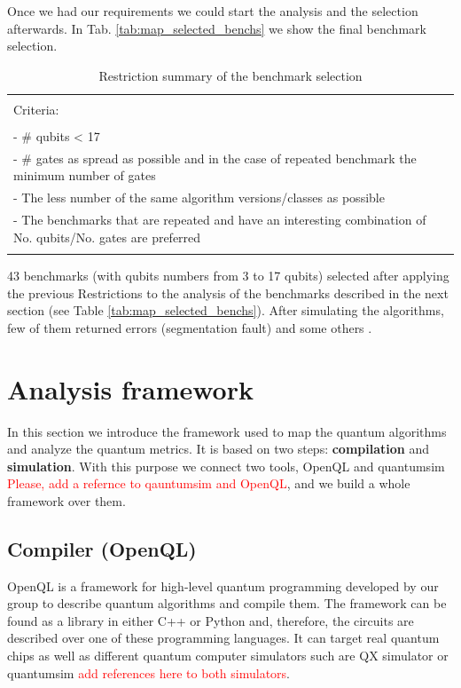 Once we had our requirements we could start the analysis and the selection afterwards.
In Tab. \ref{tab:map_selected_benchs} we show the final benchmark selection.
\begin{table}[htbp]
\caption{\label{tab:org0f8ca31}
Restriction summary of the benchmark selection}
\centering
\begin{tabular}{|l|}
\hline
\\
Criteria:\\
\\
- \# qubits < 17\\
- \# gates as spread as possible and in the case of repeated benchmark the minimum number of gates\\
- The less number of the same algorithm versions/classes as possible\\
- The benchmarks that are repeated and have an interesting combination of No. qubits/No. gates are  preferred\\
\\
\hline
\end{tabular}
\end{table}
43 benchmarks (with qubits numbers from 3 to 17 qubits) selected after applying the previous Restrictions to the analysis of the benchmarks described in the next section (see Table \ref{tab:map_selected_benchs}).
After simulating the algorithms, few of them returned errors (segmentation fault) and some others .

\section{Analysis framework}
\label{sec:orgc0c805b}
In this section we introduce the framework used to map the quantum algorithms and analyze the quantum metrics.
It is based on two steps: \textbf{compilation} and \textbf{simulation}.
With this purpose we connect two tools, OpenQL and quantumsim \textcolor{red}{Please, add a refernce to qauntumsim and OpenQL}, and we build a whole framework over them.

\subsection{Compiler (OpenQL)}
\label{sec:orgeebd0c8}
OpenQL is a framework for high-level quantum programming developed by our group to describe quantum algorithms and compile them.
The framework can be found as a library in either C++ or Python and, therefore, the circuits are described over one of these programming languages. It can target real quantum chips as well as different quantum computer simulators such are QX simulator or quantumsim \textcolor{red}{add references here to both simulators}. 

